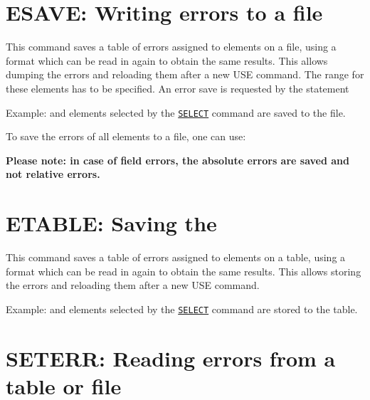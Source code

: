 
%

\section{ESAVE: Writing errors to a file}
\label{sec:esave}


This command saves a table of errors assigned to elements on a file,
using a format which can be read in again to obtain the same
results. This allows dumping the errors and reloading them after a new
USE command. The range for these elements has to be specified. An error
save is requested by the statement  

Example: 
and elements selected by the  \hyperref[sec:select]{\texttt{SELECT}}
command are saved to the file.  


To save the errors of all elements to a file, one can use: 

\textbf{Please note: in case of field errors, the absolute errors are
  saved and not relative errors. } 

\section{ETABLE: Saving the}
\label{sec:esave}


This command saves a table of errors assigned to elements on a table,
using a format which can be read in again to obtain the same
results. This allows storing the errors and reloading them after a new
USE command. 

Example: 
and elements selected by the  \hyperref[sec:select]{\texttt{SELECT}}
command are stored to the table.  


\section{SETERR: Reading errors from a table or file}
\label{sec:seterr}

